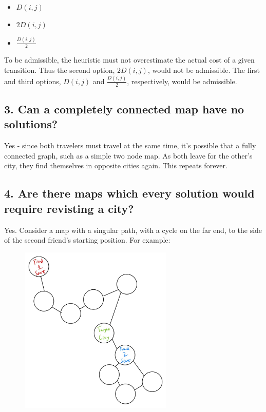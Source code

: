 \documentclass{article}
\begin{document}
\begin{itemize}
    \item $D(i,j)$
    \item $2D(i,j)$
    \item $\frac{D(i,j)}{2}$
\end{itemize}

\noindent To be admissible, the heuristic must not overestimate the actual cost of a given transition. Thus the second option, $2D(i,j)$, would not be admissible. The first and third options, $D(i,j)$ and $\frac{D(i,j)}{2}$, respectively, would be admissible.

\subsection*{3. Can a completely connected map have no solutions?}
Yes - since both travelers must travel at the same time, it's possible that a fully connected graph, such as a simple two node map. As both leave for the other's city, they find themselves in opposite cities again. This repeats forever.

\subsection*{4. Are there maps which every solution would require revisting a city?}
Yes. Consider a map with a singular path, with a cycle on the far end, to the side of the second friend's starting position. For example:

\begin{figure}[H]
    \centering
    \includegraphics[width = 0.65\textwidth]{imgs/grid_example.jpg}
\end{figure}
\end{document}
